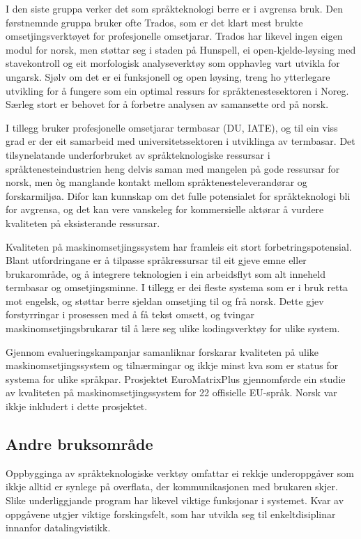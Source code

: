\begin{multicols}{2}
I den siste gruppa verker det som språkteknologi berre er i avgrensa bruk. Den førstnemnde gruppa bruker ofte Trados, som er det klart mest brukte omsetjingsverktøyet for profesjonelle omsetjarar. Trados har likevel ingen eigen modul for norsk, men støttar seg i staden på Hunspell, ei open-kjelde-løysing med stavekontroll og eit morfologisk analyseverktøy som opphavleg vart utvikla for ungarsk. Sjølv om det er ei funksjonell og open løysing, treng ho ytterlegare utvikling for å fungere som ein optimal ressurs for språktenestesektoren i Noreg. Særleg stort er behovet for å forbetre analysen av samansette ord på norsk. 

I tillegg bruker profesjonelle omsetjarar termbasar (DU, IATE), og til ein viss grad er der eit samarbeid med universitetssektoren i utviklinga av termbasar. Det tilsynelatande underforbruket av språkteknologiske ressursar i språktenesteindustrien heng delvis saman med mangelen på gode ressursar for norsk, men òg manglande kontakt mellom språktenesteleverandørar og forskarmiljøa. Difor kan kunnskap om det fulle potensialet for språkteknologi bli for avgrensa, og det kan vere vanskeleg for kommersielle aktørar å vurdere kvaliteten på eksisterande ressursar.

Kvaliteten på maskinomsetjingssystem har framleis eit stort forbetringspotensial. Blant utfordringane er å tilpasse språkressursar til eit gjeve emne eller brukarområde, og å integrere teknologien i ein arbeidsflyt som alt inneheld termbasar og omsetjingsminne. I tillegg er dei fleste systema som er i bruk retta mot engelsk, og støttar berre sjeldan omsetjing til og frå norsk. Dette gjev forstyrringar i prosessen med å få tekst omsett, og tvingar maskinomsetjingsbrukarar til å lære seg ulike kodingsverktøy for ulike system.

Gjennom evalueringskampanjar samanliknar forskarar kvaliteten på ulike maskinomsetjingssystem og tilnærmingar og ikkje minst kva som er status for systema for ulike språkpar.
Prosjektet EuroMatrixPlus gjennomførde ein studie av kvaliteten på maskinomsetjingssystem for 22 offisielle EU-språk.
Norsk var ikkje inkludert i dette prosjektet.

\subsection{Andre bruksområde}

Oppbygginga av språkteknologiske verktøy omfattar ei rekkje underoppgåver som ikkje alltid er synlege på overflata, der kommunikasjonen med brukaren skjer. Slike underliggjande program har likevel viktige funksjonar i systemet. Kvar av oppgåvene utgjer viktige forskingsfelt, som har utvikla seg til enkeltdisiplinar innanfor datalingvistikk.


\end{multicols}
